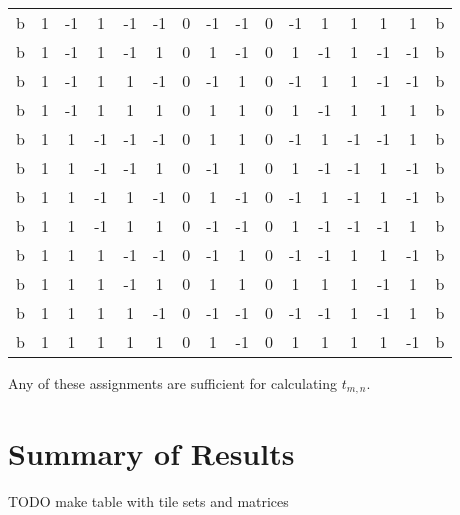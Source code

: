 \documentclass[12pt]{article}
\theoremstyle{plain}
\theoremstyle{definition}
\theoremstyle{remark}
\theoremstyle{definition}
\begin{document}
\begin{center}
\begin{tabular}{|c|c|c|c|c|c|c|c|c|c|c|c|c|c|c|c|}
b & 1 & -1 & 1 & -1 & -1 & 0 & -1 & -1 & 0 & -1 & 1 & 1 & 1 & 1 & b \\
b & 1 & -1 & 1 & -1 & 1 & 0 & 1 & -1 & 0 & 1 & -1 & 1 & -1 & -1 & b \\
b & 1 & -1 & 1 & 1 & -1 & 0 & -1 & 1 & 0 & -1 & 1 & 1 & -1 & -1 & b \\
b & 1 & -1 & 1 & 1 & 1 & 0 & 1 & 1 & 0 & 1 & -1 & 1 & 1 & 1 & b \\
b & 1 & 1 & -1 & -1 & -1 & 0 & 1 & 1 & 0 & -1 & 1 & -1 & -1 & 1 & b \\
b & 1 & 1 & -1 & -1 & 1 & 0 & -1 & 1 & 0 & 1 & -1 & -1 & 1 & -1 & b \\
b & 1 & 1 & -1 & 1 & -1 & 0 & 1 & -1 & 0 & -1 & 1 & -1 & 1 & -1 & b \\
b & 1 & 1 & -1 & 1 & 1 & 0 & -1 & -1 & 0 & 1 & -1 & -1 & -1 & 1 & b \\
b & 1 & 1 & 1 & -1 & -1 & 0 & -1 & 1 & 0 & -1 & -1 & 1 & 1 & -1 & b \\
b & 1 & 1 & 1 & -1 & 1 & 0 & 1 & 1 & 0 & 1 & 1 & 1 & -1 & 1 & b \\
b & 1 & 1 & 1 & 1 & -1 & 0 & -1 & -1 & 0 & -1 & -1 & 1 & -1 & 1 & b \\
b & 1 & 1 & 1 & 1 & 1 & 0 & 1 & -1 & 0 & 1 & 1 & 1 & 1 & -1 & b \\
\hline
\end{tabular}
\end{center}

Any of these assignments are sufficient for calculating $t_{m,n}$. 

\section{Summary of Results}
\label{section: summary of results}

TODO make table with tile sets and matrices
\end{document}
